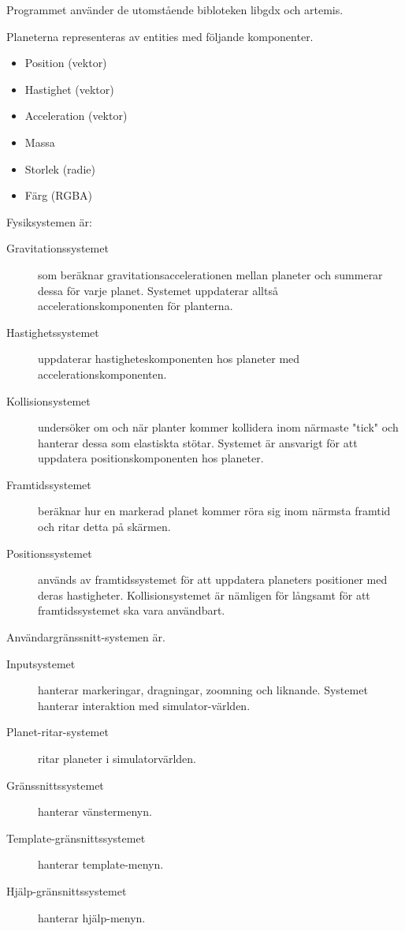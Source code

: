 Programmet använder de utomstående bibloteken libgdx och artemis.

Planeterna representeras av entities med följande komponenter.
\begin{itemize}
    \item Position (vektor)
    \item Hastighet (vektor)
    \item Acceleration (vektor)
    \item Massa
    \item Storlek (radie)
    \item Färg (RGBA)
\end{itemize}

Fysiksystemen är:
\begin{description}
    \item[Gravitationssystemet] som beräknar gravitationsaccelerationen mellan planeter
        och summerar dessa för varje planet.
        Systemet uppdaterar alltså accelerationskomponenten för planterna.
    \item[Hastighetssystemet] uppdaterar hastigheteskomponenten hos
        planeter med accelerationskomponenten.
    \item[Kollisionsystemet] undersöker om och när planter kommer kollidera
        inom närmaste "tick" och hanterar dessa som elastiskta stötar.
        Systemet är ansvarigt för att uppdatera positionskomponenten
        hos planeter.
    \item[Framtidssystemet] beräknar hur en markerad planet
        kommer röra sig inom närmsta framtid och ritar detta på skärmen.
    \item[Positionssystemet] används av framtidssystemet för att uppdatera
        planeters positioner med deras hastigheter. Kollisionsystemet
        är nämligen för långsamt för att framtidssystemet ska
        vara användbart.
\end{description}

Användargränssnitt-systemen är.
\begin{description}
    \item[Inputsystemet] hanterar markeringar, dragningar,
        zoomning och liknande.
        Systemet hanterar interaktion med simulator-världen.
    \item[Planet-ritar-systemet] ritar planeter i simulatorvärlden.
    \item[Gränssnittssystemet] hanterar vänstermenyn.
    \item[Template-gränsnittssystemet] hanterar template-menyn.
    \item[Hjälp-gränsnittssystemet] hanterar hjälp-menyn.
\end{description}

